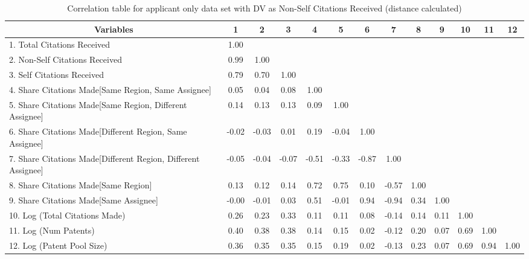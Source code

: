 \begin{table}[htbp]\centering \caption{Correlation table for applicant only data set with DV as Non-Self Citations Received (distance calculated)\label{a.ncorrelation}}
\scriptsize
\singlespacing
\begin{adjustbox}{angle=90}
\begin{tabular}{l  c  c  c  c  c  c  c  c  c  c  c  c }\hline\hline
\multicolumn{1}{c}{Variables} &1&2&3&4&5&6&7&8&9&10&11&12\\ \hline
1. Total Citations Received&1.00\\
2. Non-Self Citations Received&0.99&1.00\\
3. Self Citations Received&0.79&0.70&1.00\\
4. Share Citations Made[Same Region, Same Assignee]&0.05&0.04&0.08&1.00\\
5. Share Citations Made[Same Region, Different Assignee]&0.14&0.13&0.13&0.09&1.00\\
6. Share Citations Made[Different Region, Same Assignee]&-0.02&-0.03&0.01&0.19&-0.04&1.00\\
7. Share Citations Made[Different Region, Different Assignee]&-0.05&-0.04&-0.07&-0.51&-0.33&-0.87&1.00\\
8. Share Citations Made[Same Region]&0.13&0.12&0.14&0.72&0.75&0.10&-0.57&1.00\\
9. Share Citations Made[Same Assignee]&-0.00&-0.01&0.03&0.51&-0.01&0.94&-0.94&0.34&1.00\\
10. Log (Total Citations Made)&0.26&0.23&0.33&0.11&0.11&0.08&-0.14&0.14&0.11&1.00\\
11. Log (Num Patents)&0.40&0.38&0.38&0.14&0.15&0.02&-0.12&0.20&0.07&0.69&1.00\\
12. Log (Patent Pool Size)&0.36&0.35&0.35&0.15&0.19&0.02&-0.13&0.23&0.07&0.69&0.94&1.00\\
\hline \hline 
 \end{tabular}
 \end{adjustbox}
\end{table}
